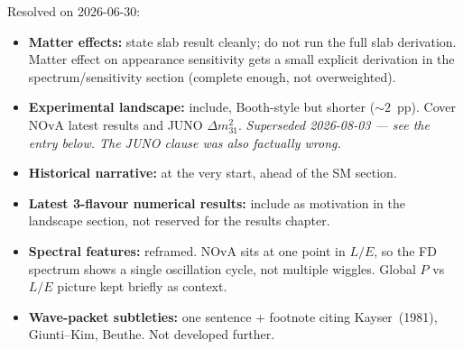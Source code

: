 \documentclass[11pt]{article}
\begin{document}
Resolved on 2026-06-30:
\begin{itemize}
    \item[$\checkmark$] \textbf{Matter effects:} state slab result cleanly; do not run the full
    slab derivation. Matter effect on appearance sensitivity gets a small explicit derivation
    in the spectrum/sensitivity section (complete enough, not overweighted).
    \item[$\checkmark$] \textbf{Experimental landscape:} include, Booth-style but shorter
    ($\sim 2$~pp). Cover NOvA latest results and JUNO $\Delta m^{2}_{31}$.
    \emph{Superseded 2026-08-03 --- see the entry below. The JUNO clause was also factually
    wrong.}
    \item[$\checkmark$] \textbf{Historical narrative:} at the very start, ahead of the SM section.
    \item[$\checkmark$] \textbf{Latest 3-flavour numerical results:} include as motivation in the
    landscape section, not reserved for the results chapter.
    \item[$\checkmark$] \textbf{Spectral features:} reframed. NOvA sits at one point in $L/E$,
    so the FD spectrum shows a single oscillation cycle, not multiple wiggles. Global $P$ vs
    $L/E$ picture kept briefly as context.
    \item[$\checkmark$] \textbf{Wave-packet subtleties:} one sentence + footnote citing
    Kayser~(1981), Giunti--Kim, Beuthe. Not developed further.
\end{itemize}
\end{document}
